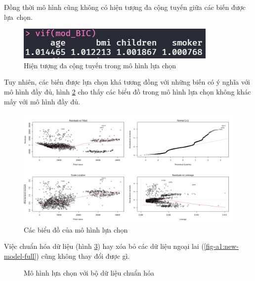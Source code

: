 Đồng thời mô hình cũng không có hiện tượng đa cộng tuyến giữa các biến được lựa~chọn.
\begin{figure}[H]
	\centering
	\includegraphics[width=0.35\linewidth]{images/A1/model-bic-vif}
	\caption{Hiện tượng đa cộng tuyến trong mô hình lựa chọn}
	\label{fig-a1:model-bic-vif}
\end{figure}

Tuy nhiên, các biến được lựa chọn khá tương đồng với những biến có ý nghĩa với mô hình đầy đủ, hình \ref{fig-a1:model-bic-plot} cho thấy các biểu đồ trong mô hình lựa chọn không khác mấy với mô hình đầy đủ. 
\begin{figure}[H]
	\centering
	\includegraphics[width=0.7\linewidth]{images/A1/model-bic-plot}
	\caption{Các biểu đồ của mô hình lựa chọn}
	\label{fig-a1:model-bic-plot}
\end{figure}

Việc chuẩn hóa dữ liệu (hình \ref{fig-a1:scaled-model-full}) hay xóa bỏ các dữ liệu ngoại lai (\ref{fig-a1:new-model-full}) cũng không thay đổi được gì.
\begin{figure}[H]
	\centering
	\hfill
	\caption{Mô hình lựa chọn với bộ dữ liệu chuẩn hóa}
	\label{fig-a1:scaled-model-full}
\end{figure}

